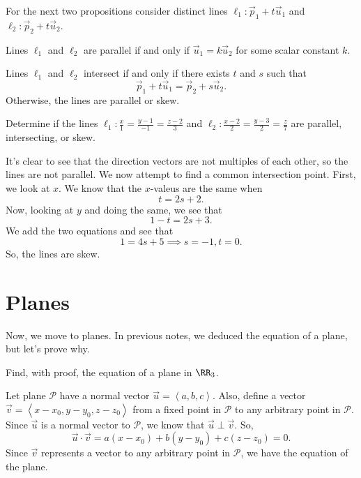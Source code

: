 For the next two propositions consider distinct lines $\ell_{1} : \vec{p}_{1} + t\vec{u}_{1}$ and $\ell_{2} : \vec{p}_{2} + t\vec{u}_{2}$.

\begin{theorem}
    Lines $\ell_{1}$ and $\ell_{2}$ are parallel if and only if $\vec{u}_{1} = k\vec{u}_{2}$ for some scalar constant $k$.
\end{theorem}

\begin{theorem}
    Lines $\ell_{1}$ and $\ell_{2}$ intersect if and only if there exists $t$ and $s$ such that
    \[\vec{p}_{1} + t\vec{u}_{1} = \vec{p}_{2} + s\vec{u}_{2}.\]
    Otherwise, the lines are parallel or skew.
\end{theorem}

\begin{example}
    Determine if the lines $\ell_{1} : \frac{x}{1} = \frac{y - 1}{-1} = \frac{z - 2}{3}$ and $\ell_{2} : \frac{x - 2}{2} = \frac{y -  3}{2} = \frac{z}{7}$ are parallel, intersecting, or skew.

    \begin{soln}
        It's clear to see that the direction vectors are not multiples of each other, so the lines are not parallel. We now attempt to find a common intersection point. First, we look at $x$. We know that the $x$-valeus are the same when
        \[t = 2s + 2.\]
        Now, looking at $y$ and doing the same, we see that
        \[1 - t = 2s + 3.\]
        We add the two equations and see that
        \[1 = 4s + 5 \implies s = -1, t = 0.\]
        So, the lines are skew.
    \end{soln}
\end{example}

\section{Planes}

Now, we move to planes. In previous notes, we deduced the equation of a plane, but let's prove why.

\begin{example}
    Find, with proof, the equation of a plane in $\RR_{3}$.

    \begin{soln}
        Let plane $\mathcal{P}$ have a normal vector $\vec{u} = \left<a, b, c\right>$. Also, define a vector $\vec{v} = \left<x - x_{0}, y - y_{0}, z - z_{0}\right>$ from a fixed point in $\mathcal{P}$ to any arbitrary point in $\mathcal{P}$. Since $\vec{u}$ is a normal vector to $\mathcal{P}$, we know that $\vec{u} \perp \vec{v}$. So,
        \[\vec{u} \cdot \vec{v} = a(x - x_{0}) + b(y - y_{0}) + c(z - z_{0}) = 0.\]
        Since $\vec{v}$ represents a vector to any arbitrary point in $\mathcal{P}$, we have the equation of the plane.
    \end{soln}
\end{example}

